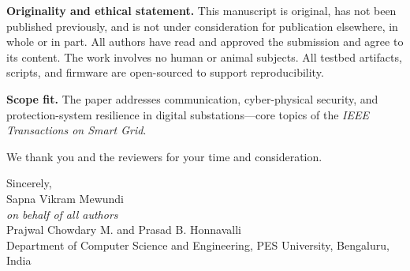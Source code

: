 \documentclass[11pt]{article}
\begin{document}
\textbf{Originality and ethical statement.} This manuscript is original, has not been published previously, and is not under consideration for publication elsewhere, in whole or in part. All authors have read and approved the submission and agree to its content. The work involves no human or animal subjects. All testbed artifacts, scripts, and firmware are open-sourced to support reproducibility.

\textbf{Scope fit.} The paper addresses communication, cyber-physical security, and protection-system resilience in digital substations---core topics of the \textit{IEEE Transactions on Smart Grid}.

We thank you and the reviewers for your time and consideration.

\vspace{10pt}
\noindent Sincerely, \\
\vspace{2pt}
\noindent Sapna Vikram Mewundi \\
\textit{on behalf of all authors} \\
Prajwal Chowdary M. and Prasad B. Honnavalli \\
Department of Computer Science and Engineering, PES University, Bengaluru, India
\end{document}
